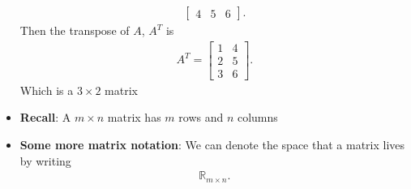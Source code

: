 \documentclass{report}
\begin{document}
\begin{itemize}
\begin{align*}
\begin{bmatrix}
                    4 & 5 & 6
                \end{bmatrix}
            .\end{align*}
            Then the transpose of $A$, $A^{T}$ is 
            \begin{align*}
                A^{T} = 
                \begin{bmatrix}
                    1 & 4 \\
                    2 & 5 \\
                    3 & 6
                \end{bmatrix}
            .\end{align*}
            Which is a $3\times 2$ matrix
        \item \textbf{Recall}: A $m\times n$ matrix has $m$ rows and $n$ columns
        \item \textbf{Some more matrix notation}: We can denote the space that a matrix lives by writing
            \begin{align*}
                \mathbb{R}_{m\times n}
            .\end{align*}


\end{itemize}
\end{document}
